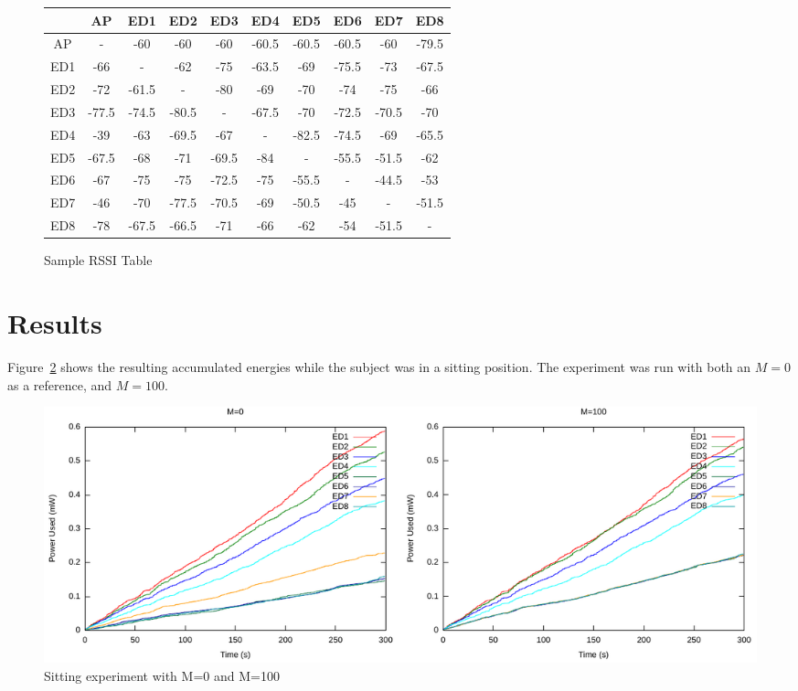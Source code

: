 \documentclass{article}
\begin{document}
\begin{figure}[htb]
\label{tab:rssi}
\begin{tabular}{|c|c|c|c|c|c|c|c|c|c|}
\hline  & AP & ED1 & ED2 & ED3 & ED4 & ED5 & ED6 & ED7 & ED8 \\ 
\hline AP & - & -60 & -60 & -60 & -60.5 & -60.5 & -60.5 & -60 & -79.5 \\ 
\hline ED1 & -66 & - & -62 & -75 & -63.5 & -69 & -75.5 & -73 & -67.5 \\ 
\hline ED2 & -72 & -61.5 & - & -80 & -69 & -70 & -74 & -75 & -66 \\ 
\hline ED3 & -77.5 & -74.5 & -80.5 & - & -67.5 & -70 & -72.5 & -70.5 & -70 \\ 
\hline ED4 & -39 & -63 & -69.5 & -67 & - & -82.5 & -74.5 & -69 & -65.5 \\ 
\hline ED5 & -67.5 & -68 & -71 & -69.5 & -84 & - & -55.5 & -51.5 & -62 \\ 
\hline ED6 & -67 & -75 & -75 & -72.5 & -75 & -55.5 & - & -44.5 & -53 \\ 
\hline ED7 & -46 & -70 & -77.5 & -70.5 & -69 & -50.5 & -45 & - & -51.5 \\ 
\hline ED8 & -78 & -67.5 & -66.5 & -71 & -66 & -62 & -54 & -51.5 & - \\ 
\hline 
\end{tabular} 
\caption{Sample RSSI Table}
\end{figure}

\section{Results}

Figure~\ref{fig:sit1plots} shows the resulting accumulated energies while the subject was in a sitting position. The experiment was run with both an $M=0$ as a reference, and $M=100$. 

\begin{figure}[htb]
\begin{center}
\includegraphics[width=1.0\textwidth]{figures/sit1plots.pdf}
\end{center}
\caption{Sitting experiment with M=0 and M=100}
\label{fig:sit1plots}
\end{figure}
\end{document}
